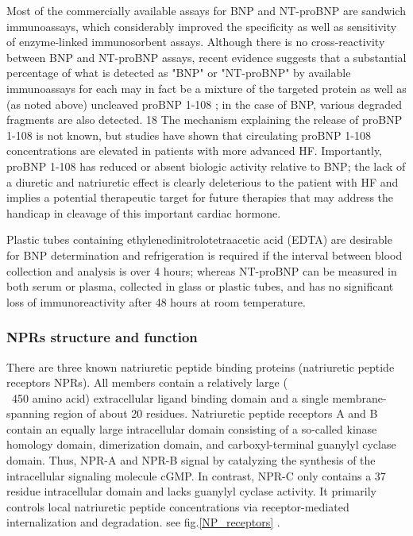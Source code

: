 \documentclass[14pt,a4paper,onecolumn]{extarticle}
\begin{document}
Most of the commercially available assays for BNP and NT-proBNP are sandwich immunoassays, which considerably improved the specificity as well as sensitivity of enzyme-linked immunosorbent assays. Although there is no cross-reactivity between BNP and NT-proBNP assays, recent evidence suggests that a substantial percentage of what is detected as "BNP" or "NT-proBNP" by available immunoassays for each may in fact be a mixture of the targeted protein as well as  (as noted above) uncleaved proBNP 1-108 ; in the case of BNP, various degraded fragments are also detected. 18 The mechanism explaining the release of proBNP 1-108 is not known, but studies have shown that circulating proBNP 1-108 concentrations are elevated in patients with more advanced HF. Importantly, proBNP 1-108 has reduced or absent biologic activity relative to BNP; the lack of a diuretic and natriuretic effect is clearly deleterious to the patient with HF and implies a potential therapeutic target for future therapies that may address the handicap in cleavage of this important cardiac hormone. \citep{Gaggin2014} %

Plastic tubes containing ethylenedinitrolotetraacetic acid (EDTA) are desirable for BNP determination and refrigeration is required if the interval between blood collection and analysis is over 4 hours; whereas NT-proBNP can be measured in both serum or plasma, collected in glass or plastic tubes, and has no significant loss of immunoreactivity after 48 hours at room temperature. \citep{Omland2008} %

\subsubsection{NPRs structure and function}

There are three known natriuretic peptide binding proteins (natriuretic peptide receptors NPRs). All members contain a relatively large (\\~450 amino acid) extracellular ligand binding domain and a single membrane-spanning region of about 20 residues. Natriuretic peptide receptors A and B contain an equally large intracellular domain consisting of a so-called kinase homology domain, dimerization domain, and carboxyl-terminal guanylyl cyclase domain. Thus, NPR-A and NPR-B signal by catalyzing the synthesis of the intracellular signaling molecule cGMP. In contrast, NPR-C only contains a 37 residue intracellular domain and lacks guanylyl cyclase activity. It primarily controls local natriuretic peptide concentrations via receptor-mediated internalization and degradation. see fig.\ref{NP_receptors} \citep{Rose2008}.
\end{document}
